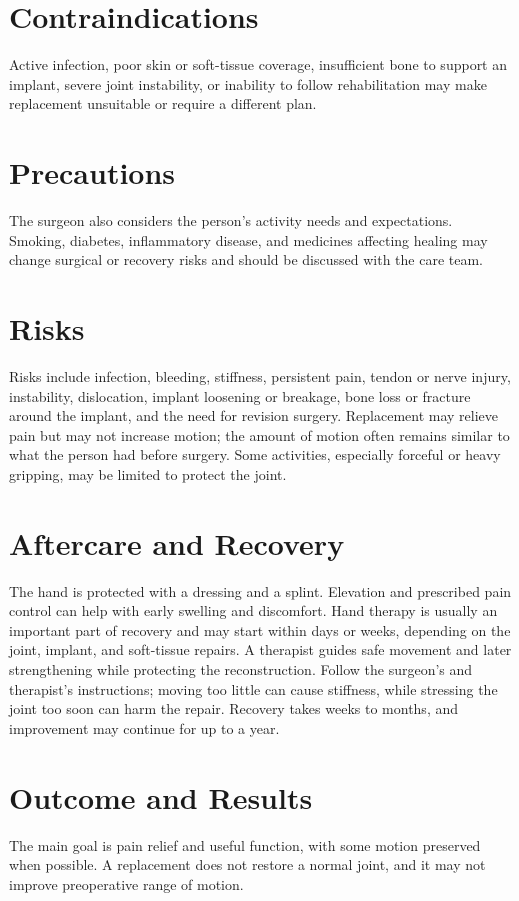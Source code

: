 \section*{Contraindications}
Active infection, poor skin or soft-tissue coverage, insufficient bone to support an implant, severe joint instability, or inability to follow rehabilitation may make replacement unsuitable or require a different plan.

\section*{Precautions}
The surgeon also considers the person's activity needs and expectations. Smoking, diabetes, inflammatory disease, and medicines affecting healing may change surgical or recovery risks and should be discussed with the care team.

\section*{Risks}
Risks include infection, bleeding, stiffness, persistent pain, tendon or nerve injury, instability, dislocation, implant loosening or breakage, bone loss or fracture around the implant, and the need for revision surgery. Replacement may relieve pain but may not increase motion; the amount of motion often remains similar to what the person had before surgery. Some activities, especially forceful or heavy gripping, may be limited to protect the joint.

\section*{Aftercare and Recovery}
The hand is protected with a dressing and a splint. Elevation and prescribed pain control can help with early swelling and discomfort. Hand therapy is usually an important part of recovery and may start within days or weeks, depending on the joint, implant, and soft-tissue repairs. A therapist guides safe movement and later strengthening while protecting the reconstruction. Follow the surgeon's and therapist's instructions; moving too little can cause stiffness, while stressing the joint too soon can harm the repair. Recovery takes weeks to months, and improvement may continue for up to a year.

\section*{Outcome and Results}
The main goal is pain relief and useful function, with some motion preserved when possible. A replacement does not restore a normal joint, and it may not improve preoperative range of motion.

